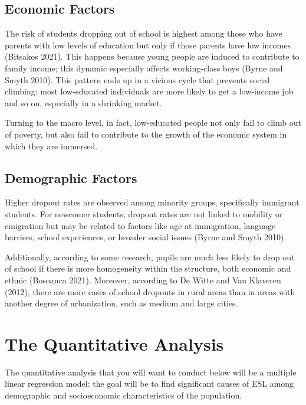 \documentclass[
  letterpaper,
  DIV=11,
  numbers=noendperiod,
  abstract]{scrartcl}
\begin{document}
\subsection{Economic Factors}\label{economic-factors}

The risk of students dropping out of school is highest among those who
have parents with low levels of education but only if those parents have
low incomes (Bitsakos 2021). This happens because young people are
induced to contribute to family income; this dynamic especially affects
working-class boys (Byrne and Smyth 2010). This pattern ends up in a
vicious cycle that prevents social climbing: most low-educated
individuals are more likely to get a low-income job and so on,
especially in a shrinking market.

Turning to the macro level, in fact, low-educated people not only fail
to climb out of poverty, but also fail to contribute to the growth of
the economic system in which they are immersed.

\subsection{Demographic Factors}\label{demographic-factors}

Higher dropout rates are observed among minority groups, specifically
immigrant students. For newcomer students, dropout rates are not linked
to mobility or emigration but may be related to factors like age at
immigration, language barriers, school experiences, or broader social
issues (Byrne and Smyth 2010).

Additionally, according to some research, pupils are much less likely to
drop out of school if there is more homogeneity within the structure,
both economic and ethnic (Bosoanca 2021). Moreover, according to De
Witte and Van Klaveren (2012), there are more cases of school dropouts
in rural areas than in areas with another degree of urbanization, such
as medium and large cities.

\section{The Quantitative Analysis}\label{the-quantitative-analysis}

The quantitative analysis that you will want to conduct below will be a
multiple linear regression model: the goal will be to find significant
causes of ESL among demographic and socioeconomic characteristics of the
population.
\end{document}
